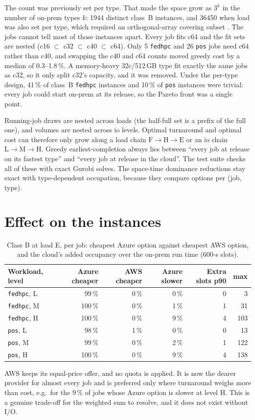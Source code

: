 \documentclass[11pt,a4paper]{article}
\newcommand{\code}[1]{\texttt{#1}}
\begin{document}
The count was previously set per type. That made the space grow as $3^k$ in the
number of on-prem types $k$: \num{1944} distinct class~B instances, and \num{36450}
when load was also set per type, which required an orthogonal-array covering subset
\citep{hedayat1999orthogonal}. The jobs cannot tell most of those instances apart.
Every job fits c64 and the fit sets are nested (c16 $\subset$ c32 $\subset$ c40
$\subset$ c64). Only 5 \code{fedhpc} and 26 \code{pos} jobs need c64 rather than
c40, and swapping the c40 and c64 counts moved greedy cost by a median of
0.3--1.8\,\%. A memory-heavy 32c/512\,GB type fit exactly the same jobs as c32, so
it only split c32's capacity, and it was removed. Under the per-type design,
41\,\% of class~B \code{fedhpc} instances and 10\,\% of \code{pos} instances were
trivial: every job could start on-prem at its release, so the Pareto front was a
single point.

Running-job draws are nested across loads (the half-full set is a prefix of the full
one), and volumes are nested across io levels. Optimal turnaround and optimal cost
can therefore only grow along a load chain $\mathrm F\to\mathrm H\to\mathrm E$ or an
io chain $\mathrm L\to\mathrm M\to\mathrm H$. Greedy earliest-completion always lies
between ``every job at release on its fastest type'' and ``every job at release in
the cloud''. The test suite checks all of these with exact Gurobi solves. The
space-time dominance reductions stay exact with type-dependent occupation, because
they compare options per (job, type).

\section{Effect on the instances}\label{sec:effect}
\begin{table}[ht]
\centering\small
\caption{Class B at load E, per job: cheapest Azure option against cheapest AWS
option, and the cloud's added occupancy over the on-prem run time (600-s slots).}
\label{tab:effect}
\begin{tabular}{lrrrrr}
\toprule
Workload, level & Azure cheaper & AWS cheaper & Azure slower & Extra slots p90 & max \\
\midrule
\code{fedhpc}, L & 99\,\%  & 0\,\% & 0\,\% & 0 & 3 \\
\code{fedhpc}, M & 100\,\% & 0\,\% & 1\,\% & 1 & 31 \\
\code{fedhpc}, H & 100\,\% & 0\,\% & 9\,\% & 4 & 103 \\
\code{pos}, L    & 98\,\%  & 1\,\% & 0\,\% & 0 & 13 \\
\code{pos}, M    & 99\,\%  & 0\,\% & 2\,\% & 1 & 122 \\
\code{pos}, H    & 100\,\% & 0\,\% & 9\,\% & 4 & 138 \\
\bottomrule
\end{tabular}
\end{table}
AWS keeps its equal-price offer, and no quota is applied. It is now the dearer
provider for almost every job and is preferred only where turnaround weighs more
than cost, e.g.\ for the 9\,\% of jobs whose Azure option is slower at level H. This
is a genuine trade-off for the weighted sum to resolve, and it does not exist
without I/O.
\end{document}
